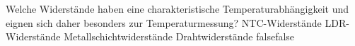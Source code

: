     {Welche Widerstände haben eine charakteristische Temperaturabhängigkeit und eignen sich daher besonders zur Temperaturmessung?}
    {NTC-Widerstände}
    {LDR-Widerstände}
    {Metallschichtwiderstände}
    {Drahtwiderstände}
    {false}{false}